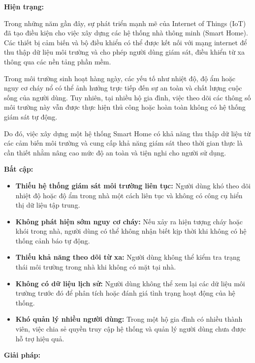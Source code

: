 \documentclass[a4paper,twoside]{article}
\begin{document}
\textbf{Hiện trạng:}

Trong những năm gần đây, sự phát triển mạnh mẽ của Internet of Things (IoT)
đã tạo điều kiện cho việc xây dựng các hệ thống nhà thông minh (Smart Home).
Các thiết bị cảm biến và bộ điều khiển có thể được kết nối với mạng internet
để thu thập dữ liệu môi trường và cho phép người dùng giám sát, điều khiển
từ xa thông qua các nền tảng phần mềm.

Trong môi trường sinh hoạt hàng ngày, các yếu tố như nhiệt độ, độ ẩm
hoặc nguy cơ cháy nổ có thể ảnh hưởng trực tiếp đến sự an toàn
và chất lượng cuộc sống của người dùng. Tuy nhiên, tại nhiều hộ gia đình,
việc theo dõi các thông số môi trường này vẫn được thực hiện thủ công
hoặc hoàn toàn không có hệ thống giám sát tự động.

Do đó, việc xây dựng một hệ thống Smart Home có khả năng thu thập dữ liệu
từ các cảm biến môi trường và cung cấp khả năng giám sát theo thời gian thực
là cần thiết nhằm nâng cao mức độ an toàn và tiện nghi cho người sử dụng.

\textbf{Bất cập:}

\begin{itemize}

\item \textbf{Thiếu hệ thống giám sát môi trường liên tục:}  
Người dùng khó theo dõi nhiệt độ hoặc độ ẩm trong nhà một cách liên tục
và không có công cụ hiển thị dữ liệu tập trung.

\item \textbf{Không phát hiện sớm nguy cơ cháy:}  
Nếu xảy ra hiện tượng cháy hoặc khói trong nhà, người dùng có thể không
nhận biết kịp thời khi không có hệ thống cảnh báo tự động.

\item \textbf{Thiếu khả năng theo dõi từ xa:}  
Người dùng không thể kiểm tra trạng thái môi trường trong nhà khi
không có mặt tại nhà.

\item \textbf{Không có dữ liệu lịch sử:}  
Người dùng không thể xem lại các dữ liệu môi trường trước đó để
phân tích hoặc đánh giá tình trạng hoạt động của hệ thống.

\item \textbf{Khó quản lý nhiều người dùng:}  
Trong một hộ gia đình có nhiều thành viên, việc chia sẻ quyền truy cập
hệ thống và quản lý người dùng chưa được hỗ trợ hiệu quả.

\end{itemize}

\textbf{Giải pháp:}
\end{document}
